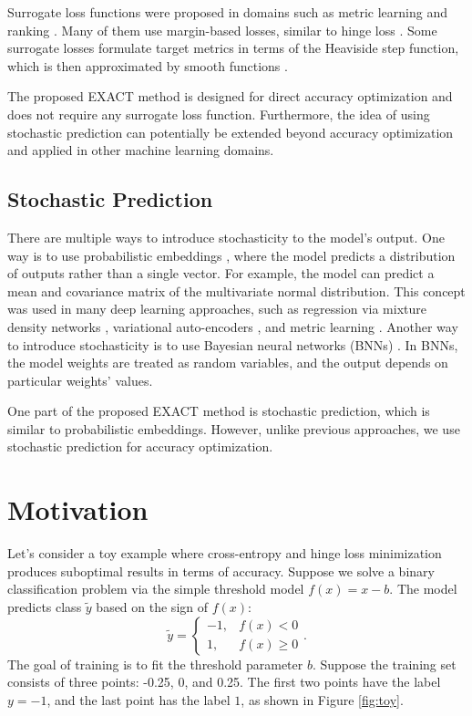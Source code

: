 \documentclass[nohyperref]{article}
\theoremstyle{plain}
\theoremstyle{definition}
\theoremstyle{remark}
\begin{document}
Surrogate loss functions were proposed in domains such as metric learning and ranking \cite{kaya2019metricsurvey, calauzenes2012surrogaterank}. Many of them use margin-based losses, similar to hinge loss \cite{weinberger2009triplet}. Some surrogate losses formulate target metrics in terms of the Heaviside step function, which is then approximated by smooth functions \cite{patel2021recallsurrogate}.

The proposed EXACT method is designed for direct accuracy optimization and does not require any surrogate loss function. Furthermore, the idea of using stochastic prediction can potentially be extended beyond accuracy optimization and applied in other machine learning domains.



\subsection{Stochastic Prediction}

There are multiple ways to introduce stochasticity to the model's output. One way is to use probabilistic embeddings \cite{shi2019probabilistic}, where the model predicts a distribution of outputs rather than a single vector. For example, the model can predict a mean and covariance matrix of the multivariate normal distribution. This concept was used in many deep learning approaches, such as regression via mixture density networks \cite{bishop1994mixture}, variational auto-encoders \cite{kingma2014vae}, and metric learning \cite{chang2020data}. Another way to introduce stochasticity is to use Bayesian neural networks (BNNs) \cite{goan2020bayesian}. In BNNs, the model weights are treated as random variables, and the output depends on particular weights' values.




One part of the proposed EXACT method is stochastic prediction, which is similar to probabilistic embeddings. However, unlike previous approaches, we use stochastic prediction for accuracy optimization.







\section{Motivation}

Let's consider a toy example where cross-entropy and hinge loss minimization produces suboptimal results in terms of accuracy. Suppose we solve a binary classification problem via the simple threshold model $f(x) = x - b$. The model predicts class $\tilde{y}$ based on the sign of $f(x)$:
\begin{equation}
    \tilde{y} = \begin{cases}
      -1, & f(x) < 0 \\
      1, & f(x) \ge 0
    \end{cases}.
\end{equation}
The goal of training is to fit the threshold parameter $b$. Suppose the training set consists of three points: -0.25, 0, and 0.25. The first two points have the label $y = -1$, and the last point has the label $1$, as shown in Figure \ref{fig:toy}.
\end{document}
